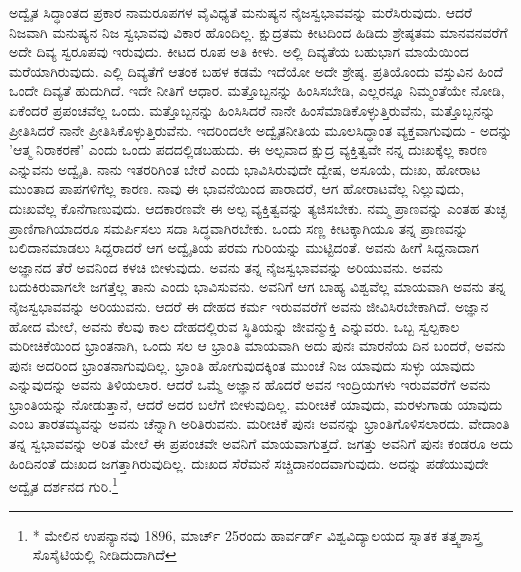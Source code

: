 ಅದ್ವೈತ ಸಿದ್ಧಾಂತದ ಪ್ರಕಾರ ನಾಮರೂಪಗಳ ವೈವಿಧ್ಯತೆ ಮನುಷ್ಯನ ನೈಜಸ್ವಭಾವವನ್ನು ಮರೆಸಿರುವುದು. ಆದರೆ ನಿಜವಾಗಿ ಮನುಷ್ಯನ ನಿಜ ಸ್ವಭಾವವು ವಿಕಾರ ಹೊಂದಿಲ್ಲ. ಕ್ಷುದ್ರತಮ ಕೀಟದಿಂದ ಹಿಡಿದು ಶ್ರೇಷ್ಠತಮ ಮಾನವನವರೆಗೆ ಅದೇ ದಿವ್ಯ ಸ್ವರೂಪವು ಇರುವುದು. ಕೀಟದ ರೂಪ ಅತಿ ಕೀಳು. ಅಲ್ಲಿ ದಿವ್ಯತೆಯ ಬಹುಭಾಗ ಮಾಯೆಯಿಂದ ಮರೆಯಾಗಿರುವುದು. ಎಲ್ಲಿ ದಿವ್ಯತೆಗೆ ಆತಂಕ ಬಹಳ ಕಡಮೆ ಇದೆಯೋ ಅದೇ ಶ್ರೇಷ್ಠ. ಪ್ರತಿಯೊಂದು ವಸ್ತುವಿನ ಹಿಂದೆ ಒಂದೇ ದಿವ್ಯತೆ ಹುದುಗಿದೆ. ಇದೇ ನೀತಿಗೆ ಆಧಾರ. ಮತ್ತೊಬ್ಬನನ್ನು ಹಿಂಸಿಸಬೇಡಿ, ಎಲ್ಲರನ್ನೂ ನಿಮ್ಮಂತೆಯೇ ನೋಡಿ, ಏಕೆಂದರೆ ಪ್ರಪಂಚವೆಲ್ಲ ಒಂದು. ಮತ್ತೊಬ್ಬನನ್ನು ಹಿಂಸಿಸಿದರೆ ನಾನೇ ಹಿಂಸೆಮಾಡಿಕೊಳ್ಳುತ್ತಿರುವೆನು, ಮತ್ತೊಬ್ಬನನ್ನು ಪ್ರೀತಿಸಿದರೆ ನಾನೇ ಪ್ರೀತಿಸಿಕೊಳ್ಳುತ್ತಿರುವೆನು. ಇದರಿಂದಲೇ ಅದ್ವೈತನೀತಿಯ ಮೂಲಸಿದ್ಧಾಂತ ವ್ಯಕ್ತವಾಗುವುದು - ಅದನ್ನು 'ಆತ್ಮ ನಿರಾಕರಣೆ' ಎಂದು ಒಂದು ಪದದಲ್ಲಿಡಬಹುದು. ಈ ಅಲ್ಪವಾದ ಕ್ಷುದ್ರ ವ್ಯಕ್ತಿತ್ವವೇ ನನ್ನ ದುಃಖಕ್ಕೆಲ್ಲ ಕಾರಣ ಎನ್ನುವನು ಅದ್ವೈತಿ. ನಾನು ಇತರರಿಗಿಂತ ಬೇರೆ ಎಂದು ಭಾವಿಸಿರುವುದೇ ದ್ವೇಷ, ಅಸೂಯೆ, ದುಃಖ, ಹೋರಾಟ ಮುಂತಾದ ಪಾಪಗಳಿಗೆಲ್ಲ ಕಾರಣ. ನಾವು ಈ ಭಾವನೆಯಿಂದ ಪಾರಾದರೆ, ಆಗ ಹೋರಾಟವೆಲ್ಲ ನಿಲ್ಲುವುದು, ದುಃಖವೆಲ್ಲ ಕೊನೆಗಾಣುವುದು. ಆದಕಾರಣವೇ ಈ ಅಲ್ಪ ವ್ಯಕ್ತಿತ್ವವನ್ನು ತ್ಯಜಿಸಬೇಕು. ನಮ್ಮ ಪ್ರಾಣವನ್ನು ಎಂತಹ ತುಚ್ಛ ಪ್ರಾಣಿಗಾಗಿಯಾದರೂ ಸಮರ್ಪಿಸಲು ಸದಾ ಸಿದ್ಧವಾಗಿರಬೇಕು. ಒಂದು ಸಣ್ಣ ಕೀಟಕ್ಕಾಗಿಯೂ ತನ್ನ ಪ್ರಾಣವನ್ನು ಬಲಿದಾನಮಾಡಲು ಸಿದ್ದರಾದರೆ ಆಗ ಅದ್ವೈತಿಯ ಪರಮ ಗುರಿಯನ್ನು ಮುಟ್ಟಿದಂತೆ. ಅವನು ಹೀಗೆ ಸಿದ್ದನಾದಾಗ ಅಜ್ಞಾನದ ತೆರೆ ಅವನಿಂದ ಕಳಚಿ ಬೀಳುವುದು. ಅವನು ತನ್ನ ನೈಜಸ್ವಭಾವವನ್ನು ಅರಿಯುವನು. ಅವನು ಬದುಕಿರುವಾಗಲೇ ಜಗತ್ತೆಲ್ಲ ತಾನು ಎಂದು ಭಾವಿಸುವನು. ಅವನಿಗೆ ಆಗ ಬಾಹ್ಯ ವಿಶ್ವವೆಲ್ಲ ಮಾಯವಾಗಿ ಅವನು ತನ್ನ ನೈಜಸ್ವಭಾವವನ್ನು ಅರಿಯುವನು. ಆದರೆ ಈ ದೇಹದ ಕರ್ಮ ಇರುವವರೆಗೆ ಅವನು ಜೀವಿಸಿರಬೇಕಾಗಿದೆ. ಅಜ್ಞಾನ ಹೋದ ಮೇಲೆ, ಅವನು ಕೆಲವು ಕಾಲ ದೇಹದಲ್ಲಿರುವ ಸ್ಥಿತಿಯನ್ನು ಜೀವನ್ಮುಕ್ತಿ ಎನ್ನುವರು. ಒಬ್ಬ ಸ್ವಲ್ಪಕಾಲ ಮರೀಚಿಕೆಯಿಂದ ಭ್ರಾಂತನಾಗಿ, ಒಂದು ಸಲ ಆ ಭ್ರಾಂತಿ ಮಾಯವಾಗಿ ಅದು ಪುನಃ ಮಾರನೆಯ ದಿನ ಬಂದರೆ, ಅವನು ಪುನಃ ಅದರಿಂದ ಭ್ರಾಂತನಾಗುವುದಿಲ್ಲ. ಭ್ರಾಂತಿ ಹೋಗುವುದಕ್ಕಿಂತ ಮುಂಚೆ ನಿಜ ಯಾವುದು ಸುಳ್ಳು ಯಾವುದು ಎನ್ನುವುದನ್ನು ಅವನು ತಿಳಿಯಲಾರ. ಆದರೆ ಒಮ್ಮೆ ಅಜ್ಞಾನ ಹೊದರೆ ಅವನ ಇಂದ್ರಿಯಗಳು ಇರುವವರೆಗೆ ಅವನು ಭ್ರಾಂತಿಯನ್ನು ನೋಡುತ್ತಾನೆ, ಆದರೆ ಅದರ ಬಲೆಗೆ ಬೀಳುವುದಿಲ್ಲ. ಮರೀಚಿಕೆ ಯಾವುದು, ಮರಳುಗಾಡು ಯಾವುದು ಎಂಬ ತಾರತಮ್ಯವನ್ನು ಅವನು ಚೆನ್ನಾಗಿ ಅರಿತಿರುವನು. ಮರೀಚಿಕೆ ಪುನಃ ಅವನನ್ನು ಭ್ರಾಂತಿಗೊಳಿಸಲಾರದು. ವೇದಾಂತಿ ತನ್ನ ಸ್ವಭಾವವನ್ನು ಅರಿತ ಮೇಲೆ ಈ ಪ್ರಪಂಚವೇ ಅವನಿಗೆ ಮಾಯವಾಗುತ್ತದೆ. ಜಗತ್ತು ಅವನಿಗೆ ಪುನಃ ಕಂಡರೂ ಅದು ಹಿಂದಿನಂತೆ ದುಃಖದ ಜಗತ್ತಾಗಿರುವುದಿಲ್ಲ. ದುಃಖದ ಸೆರೆಮನೆ ಸಚ್ಚಿದಾನಂದವಾಗುವುದು. ಅದನ್ನು ಪಡೆಯುವುದೇ ಅದ್ವೈತ ದರ್ಶನದ ಗುರಿ.\footnote{* ಮೇಲಿನ ಉಪನ್ಯಾನವು 1896, ಮಾರ್ಚ್ 25ರಂದು ಹಾರ್ವರ್ಡ್ ವಿಶ್ವವಿದ್ಯಾಲಯದ ಸ್ನಾತಕ ತತ್ತ್ವಶಾಸ್ತ್ರ ಸೊಸೈಟಿಯಲ್ಲಿ ನೀಡಿದುದಾಗಿದೆ}

